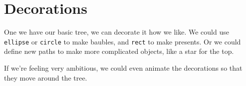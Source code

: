 \documentclass[
  xhtml,%
  use filename%
]{internet}
\begin{document}
\section{Decorations}

One we have our basic tree, we can decorate it how we like.
We could use \verb+ellipse+ or \verb+circle+ to make baubles, and \verb+rect+ to make presents.
Or we could define new paths to make more complicated objects, like a star for the top.

If we're feeling very ambitious, we could even animate the decorations so that they move around the tree.
\end{document}
